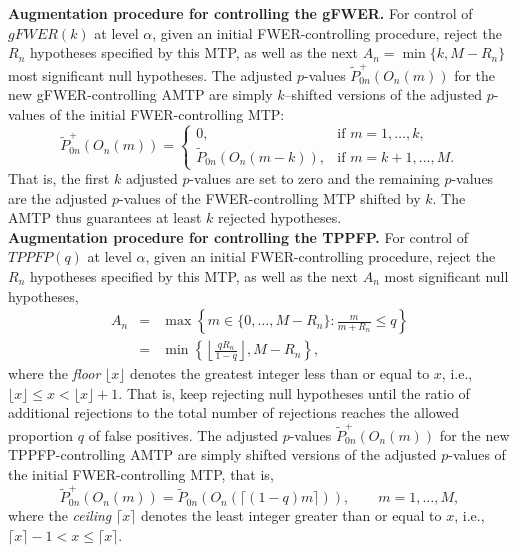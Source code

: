 \documentclass[11pt]{article}
\begin{document}
\noindent
{\bf Augmentation procedure for controlling the gFWER.} For control of $gFWER(k)$ at level $\alpha$, given an initial FWER-controlling procedure, reject the $R_n$ hypotheses specified by this MTP, as well as the next $A_n = \min\{k, M-R_n\}$ most significant null hypotheses. 
The adjusted $p$-values $\widetilde{P}_{0n}^{+}(O_n(m))$ for the new gFWER-controlling AMTP are simply $k$--shifted versions of the adjusted $p$-values of the initial FWER-controlling MTP:
\begin{equation}\label{anal:mult:e:adjpgFWER}
\widetilde{P}_{0n}^{+}(O_n(m)) =
\begin{cases}
0, & \text{if $m=1,\ldots,k$},\\
\widetilde{P}_{0n}(O_n(m-k)), & \text{if $m=k+1, \ldots, M$}.
\end{cases}
\end{equation}
That is, the first $k$ adjusted $p$-values are set to zero and the remaining $p$-values are the adjusted $p$-values of the FWER-controlling MTP shifted by $k$. The AMTP thus guarantees at least $k$ rejected hypotheses.\\


\noindent
{\bf Augmentation procedure for controlling the TPPFP.} For control of $TPPFP(q)$ at level $\alpha$, given an initial FWER-controlling procedure, reject the $R_n$ hypotheses specified by this MTP, as well as the next $A_n$ most significant null hypotheses, 
\begin{eqnarray}
\label{anal:mult:e:augTPPFP}
A_n &=& \max\left\{m \in \{0,\ldots, M - R_n\}:\frac{m}{m+ R_n}\leq q\right\} \nonumber\\
&=& \min \left\{ \left \lfloor \frac{q R_n}{1-q} \right \rfloor, M-R_n \right\},
\end{eqnarray}
where the {\em floor} $\lfloor x \rfloor$ denotes the greatest integer less than or equal to $x$, i.e., $\lfloor x \rfloor \leq x < \lfloor x \rfloor + 1$. That is, keep rejecting null hypotheses until the ratio of additional rejections to the total number of rejections reaches the allowed proportion $q$ of false positives. 
The adjusted $p$-values $\widetilde{P}_{0n}^{+}(O_n(m))$ for the new TPPFP-controlling AMTP are simply shifted versions of the adjusted $p$-values of the initial FWER-controlling MTP, that is,
\begin{equation}\label{anal:mult:e:adjpTPPFP}
\widetilde{P}_{0n}^{+}(O_n(m)) = \widetilde{P}_{0n}(O_n(\lceil(1-q)m\rceil)), \qquad m=1,\ldots,M,
\end{equation}
where the {\em ceiling} $\lceil x \rceil$ denotes the least integer greater than or equal to $x$, i.e., $\lceil x \rceil -1 < x \leq \lceil x \rceil$. \\
\end{document}
